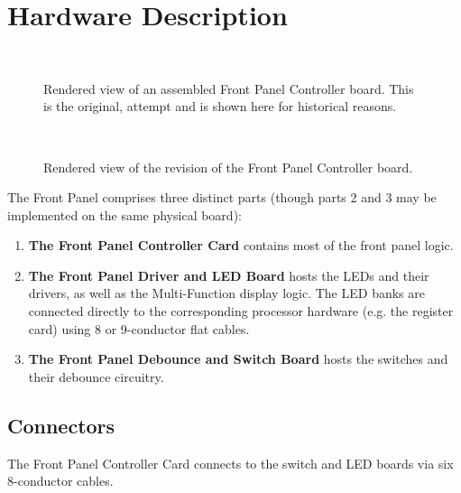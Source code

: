 \section{Hardware Description}

\begin{figure*}
\centering
{}\\
\caption[Rendered view of an assembled Front Panel
  Controller board]{\label{fig-rendered-fpc-dip}Rendered view of an assembled Front Panel
  Controller board. This is the original,  attempt and is shown here for
  historical reasons.}
\end{figure*}

\begin{figure*}
\centering
{}\\
\caption{\label{fig-rendered-fpc-smd}Rendered view of the  revision of the
  Front Panel Controller board.}
\end{figure*}


The Front Panel comprises three distinct parts (though parts 2 and 3
may be implemented on the same physical board):

\begin{enumerate}
\item{\bfseries The Front Panel Controller Card} contains most of the front
  panel logic.
\item{\bfseries The Front Panel Driver and LED Board} hosts the LEDs and
  their drivers, as well as the Multi-Function display logic. The LED
  banks are connected directly to the corresponding processor hardware
  (e.g. the register card) using 8 or 9-conductor flat cables.
\item{\bfseries The Front Panel Debounce and Switch Board} hosts the switches
  and their debounce circuitry.
\end{enumerate}

\subsection{Connectors}

The Front Panel Controller Card connects to the switch and LED boards
via six 8-conductor cables.

